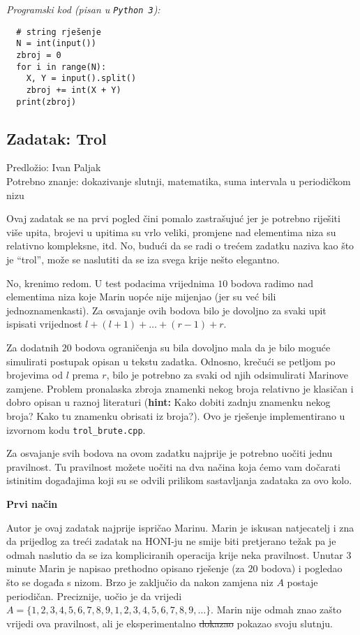 \documentclass[a4paper]{article}
\begin{document}
\textit{Programski kod (pisan u \texttt{Python 3}):}

\vspace{-2ex}
\begin{verbatim}
  # string rješenje
  N = int(input())
  zbroj = 0
  for i in range(N):
    X, Y = input().split()
    zbroj += int(X + Y)
  print(zbroj)
\end{verbatim}

\clearpage

\subsection*{Zadatak: Trol}
\textsf{Predložio: Ivan Paljak}\\
\textsf{Potrebno znanje: dokazivanje slutnji, matematika, suma intervala u
periodičkom nizu}

Ovaj zadatak se na prvi pogled čini pomalo zastrašujuć jer je potrebno riješiti
više upita, brojevi u upitima su vrlo veliki, promjene nad elementima niza su
relativno kompleksne, itd. No, budući da se radi o trećem zadatku naziva kao što
je ``trol'', može se naslutiti da se iza svega krije nešto elegantno.

No, krenimo redom. U test podacima vrijednima $10$ bodova radimo nad elementima
niza koje Marin uopće nije mijenjao (jer su već bili jednoznamenkasti).
Za osvajanje ovih bodova bilo je dovoljno za svaki upit ispisati vrijednost
$l + (l + 1) + \dots + (r - 1) + r$.

Za dodatnih $20$ bodova ograničenja su bila dovoljno mala da je bilo moguće
simulirati postupak opisan u tekstu zadatka. Odnosno, krečući se petljom po
brojevima od $l$ prema $r$, bilo je potrebno za svaki od njih odsimulirati
Marinove zamjene. Problem pronalaska zbroja znamenki nekog broja relativno je
klasičan i dobro opisan u raznoj literaturi (\textbf{hint:} Kako dobiti zadnju
znamenku nekog broja? Kako tu znamenku obrisati iz broja?). Ovo je rješenje
implementirano u izvornom kodu \texttt{trol\_brute.cpp}.

Za osvajanje svih bodova na ovom zadatku najprije je potrebno uočiti jednu
pravilnost. Tu pravilnost možete uočiti na dva načina koja ćemo vam dočarati
istinitim događajima koji su se odvili prilikom sastavljanja zadataka za ovo
kolo.

\textbf{Prvi način}

Autor je ovaj zadatak najprije ispričao Marinu. Marin je iskusan natjecatelj i
zna da prijedlog za treći zadatak na HONI-ju ne smije biti pretjerano težak pa
je odmah naslutio da se iza kompliciranih operacija krije neka pravilnost.
Unutar $3$ minute Marin je napisao prethodno opisano rješenje (za $20$ bodova) i
pogledao što se događa s nizom. Brzo je zaključio da nakon zamjena niz $A$
postaje periodičan. Preciznije, uočio je da vrijedi
$A = \{1, 2, 3, 4, 5, 6, 7, 8, 9, 1, 2, 3, 4, 5, 6, 7, 8, 9, \dots\}$. Marin
nije odmah znao zašto vrijedi ova pravilnost, ali je eksperimentalno
\sout{dokazao} pokazao svoju slutnju.
\end{document}

